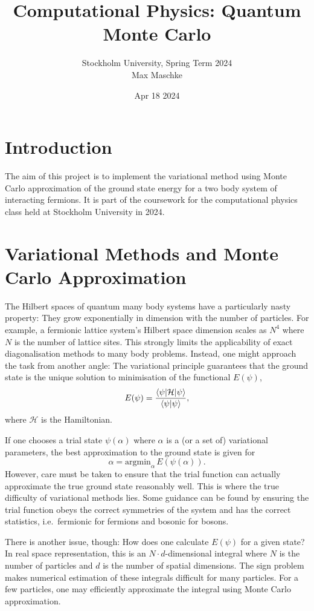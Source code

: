 \documentclass[a4paper,DIV=12,english]{scrartcl}
\title{Computational Physics: Quantum Monte Carlo}
\author{Stockholm University, Spring Term 2024 \\Max Maschke}
\date{Apr 18 2024}
\begin{document}
\maketitle


\tableofcontents
\newpage


\newpage
\section{Introduction}
The aim of this project is to implement the variational method using Monte Carlo approximation of the ground state energy for a two body system of interacting fermions. It is part of the coursework for the computational physics class held at Stockholm University in 2024.

\section{Variational Methods and Monte Carlo Approximation}
The Hilbert spaces of quantum many body systems have a particularly nasty property: They grow exponentially in dimension with the number of particles. For example, a fermionic lattice system's Hilbert space dimension scales as $N^4$ where $N$ is the number of lattice sites. This strongly limits the applicability of exact diagonalisation methods to many body problems.
Instead, one might approach the task from another angle: The variational principle guarantees that the ground state is the unique solution to minimisation of the functional $E(\psi)$,
\begin{equation}
    E(\psi) = \frac{\braket{\psi|\mathcal{H}|\psi}}{\braket{\psi|\psi}},
\end{equation}
where $\mathcal{H}$ is the Hamiltonian.

If one chooses a trial state $\psi(\alpha)$ where $\alpha$ is a (or a set of) variational parameters, the best approximation to the ground state is given for
\begin{equation}
    \alpha = \text{argmin}_\alpha\, E(\psi(\alpha)).
\end{equation}
However, care must be taken to ensure that the trial function can actually approximate the true ground state reasonably well. This is where the true difficulty of variational methods lies. Some guidance can be found by ensuring the trial function obeys the correct symmetries of the system and has the correct statistics, i.e.\ fermionic for fermions and bosonic for bosons.

There is another issue, though: How does one calculate $E(\psi)$ for a given state? In real space representation, this is an $N\cdot d$-dimensional integral where $N$ is the number of particles and $d$ is the number of spatial dimensions. The sign problem makes numerical estimation of these integrals difficult for many particles. For a few particles, one may efficiently approximate the integral using Monte Carlo approximation.
\end{document}
